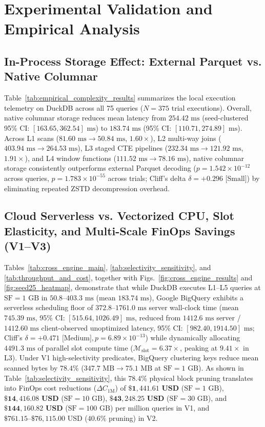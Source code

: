 \documentclass[10pt,a4paper]{article}
\begin{document}
\section{Experimental Validation and Empirical Analysis}
\subsection{In-Process Storage Effect: External Parquet vs. Native Columnar}
Table~\ref{tab:empirical_complexity_results} summarizes the local execution telemetry on DuckDB across all 75 queries ($N=375$ trial executions). Overall, native columnar storage reduces mean latency from $254.42\text{ ms}$ (seed-clustered 95\% CI: $[163.65, 362.54]\text{ ms}$) to $183.74\text{ ms}$ (95\% CI: $[110.71, 274.89]\text{ ms}$). Across L1 scans ($81.60\text{ ms} \rightarrow 50.84\text{ ms}$, $1.60\times$), L2 multi-way joins ($403.94\text{ ms} \rightarrow 264.53\text{ ms}$), L3 staged CTE pipelines ($232.34\text{ ms} \rightarrow 121.92\text{ ms}$, $1.91\times$), and L4 window functions ($111.52\text{ ms} \rightarrow 78.16\text{ ms}$), native columnar storage consistently outperforms external Parquet decoding ($p = 1.542 \times 10^{-12}$ across queries, $p = 1.783 \times 10^{-55}$ across trials; Cliff's delta $\delta = +0.296\text{ [Small]}$) by eliminating repeated ZSTD decompression overhead.



\subsection{Cloud Serverless vs. Vectorized CPU, Slot Elasticity, and Multi-Scale FinOps Savings (V1--V3)}
Tables~\ref{tab:cross_engine_main}, \ref{tab:selectivity_sensitivity}, and \ref{tab:throughput_and_cost}, together with Figs.~\ref{fig:cross_engine_results} and \ref{fig:seed25_heatmap}, demonstrate that while DuckDB executes L1--L5 queries at $\text{SF}=1\text{ GB}$ in $50.8\text{--}403.3\text{ ms}$ (mean $183.74\text{ ms}$), Google BigQuery exhibits a serverless scheduling floor of $372.8\text{--}1761.0\text{ ms}$ server wall-clock time (mean $745.39\text{ ms}$, 95\% CI: $[515.64, 1026.49]\text{ ms}$, reduced from $1412.6\text{ ms}$ server / $1412.60\text{ ms}$ client-observed unoptimized latency, 95\% CI: $[982.40, 1914.50]\text{ ms}$; Cliff's $\delta = +0.471\text{ [Medium]}, p = 6.89 \times 10^{-13}$) while dynamically allocating $4491.3\text{ ms}$ of parallel slot compute time ($\mathcal{M}_{\text{slot}} = 6.37\times$, peaking at $9.41\times$ in L3). Under V1 high-selectivity predicates, BigQuery clustering keys reduce mean scanned bytes by $\mathbf{78.4\%}$ ($347.7\text{ MB} \rightarrow 75.1\text{ MB}$ at $\text{SF}=1\text{ GB}$). As shown in Table~\ref{tab:selectivity_sensitivity}, this $78.4\%$ physical block pruning translates into FinOps cost reductions ($\Delta C_{\text{1M}}$) of $\mathbf{\$1,441.61\text{ USD}}$ ($\text{SF}=1\text{ GB}$), $\mathbf{\$14,416.08\text{ USD}}$ ($\text{SF}=10\text{ GB}$), $\mathbf{\$43,248.25\text{ USD}}$ ($\text{SF}=30\text{ GB}$), and $\mathbf{\$144,160.82\text{ USD}}$ ($\text{SF}=100\text{ GB}$) per million queries in V1, and $\$761.15\text{--}\$76,115.00\text{ USD}$ ($40.6\%$ pruning) in V2.
\end{document}
